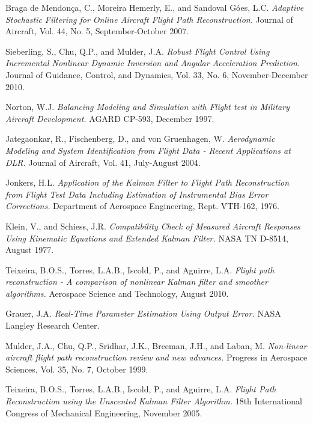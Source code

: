 \documentclass[]{aiaa-tc}%
\begin{document}
\begin{thebibliography}{9}%

Braga de Mendon\c ca, C., Moreira Hemerly, E., and Sandoval G\'oes, L.C.\textit{ Adaptive Stochastic Filtering for Online Aircraft Flight Path Reconstruction.} Journal of Aircraft, Vol. 44, No. 5, September-October 2007.

Sieberling, S., Chu, Q.P., and Mulder, J.A.\textit{ Robust Flight Control Using Incremental Nonlinear Dynamic Inversion and Angular Acceleration Prediction.} Journal of Guidance, Control, and Dynamics, Vol. 33, No. 6, November-December 2010.

Norton, W.J.\textit{ Balancing Modeling and Simulation with Flight test in Military Aircraft Development.} AGARD CP-593, December 1997.

Jategaonkar, R., Fischenberg, D., and von Gruenhagen, W.\textit{ Aerodynamic Modeling and System Identification from Flight Data - Recent Applications at DLR.} Journal of Aircraft, Vol. 41, July-August 2004.

Jonkers, H.L.\textit{ Application of the Kalman Filter to Flight Path Reconstruction from Flight Test Data Including Estimation of Instrumental Bias Error Corrections.} Department of Aerospace Engineering, Rept. VTH-162, 1976.

Klein, V., and Schiess, J.R.\textit{ Compatibility Check of Measured Aircraft Responses Using Kinematic Equations and Extended Kalman Filter.} NASA TN D-8514, August 1977.

Teixeira, B.O.S., Torres, L.A.B., Iscold, P., and Aguirre, L.A.\textit{ Flight path reconstruction - A comparison of nonlinear Kalman filter and smoother algorithms.} Aerospace Science and Technology, August 2010.

Grauer, J.A.\textit{ Real-Time Parameter Estimation Using Output Error.} NASA Langley Research Center.

Mulder, J.A., Chu, Q.P., Sridhar, J.K., Breeman, J.H., and Laban, M.\textit{ Non-linear aircraft flight path reconstruction review and new advances.} Progress in Aerospace Sciences, Vol. 35, No. 7, October 1999.

Teixeira, B.O.S., Torres, L.A.B., Iscold, P., and Aguirre, L.A.\textit{ Flight Path Reconstruction using the Unscented Kalman Filter Algorithm.} 18th International Congress of Mechanical Engineering, November 2005.


\end{thebibliography}
\end{document}
